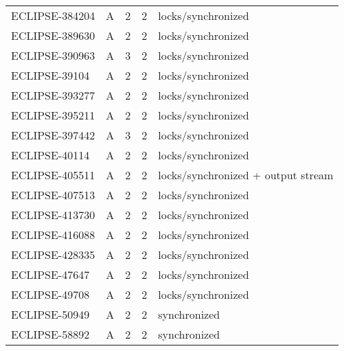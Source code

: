 \begin{table}[!htp]
{\begin{tabular}{lllll}
    ECLIPSE-384204 & A        & 2             & 2               & locks/synchronized                          \\
    ECLIPSE-389630 & A        & 2             & 2               & locks/synchronized                          \\
    ECLIPSE-390963 & A        & 3             & 2               & locks/synchronized                          \\
    ECLIPSE-39104  & A        & 2             & 2               & locks/synchronized                          \\
    ECLIPSE-393277 & A        & 2             & 2               & locks/synchronized                          \\
    ECLIPSE-395211 & A        & 2             & 2               & locks/synchronized                          \\
    ECLIPSE-397442 & A        & 3             & 2               & locks/synchronized                          \\
    ECLIPSE-40114  & A        & 2             & 2               & locks/synchronized                          \\
    ECLIPSE-405511 & A        & 2             & 2               & locks/synchronized + output stream          \\
    ECLIPSE-407513 & A        & 2             & 2               & locks/synchronized                          \\
    ECLIPSE-413730 & A        & 2             & 2               & locks/synchronized                          \\
    ECLIPSE-416088 & A        & 2             & 2               & locks/synchronized                          \\
    ECLIPSE-428335 & A        & 2             & 2               & locks/synchronized                          \\
    ECLIPSE-47647  & A        & 2             & 2               & locks/synchronized                          \\
    ECLIPSE-49708  & A        & 2             & 2               & locks/synchronized                          \\
    ECLIPSE-50949  & A        & 2             & 2               & synchronized                                \\
    ECLIPSE-58892  & A        & 2             & 2               & synchronized                                \\

\end{tabular}}
\end{table}
